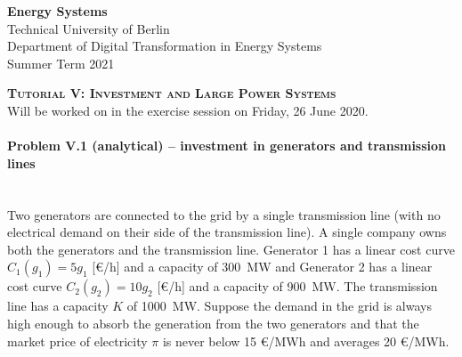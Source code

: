 \documentclass[11pt,a4paper,fleqn]{scrartcl}
\begin{document}
\begin{flushright}
	\textbf{Energy Systems}\\
	{\small Technical University of Berlin}\\
	{\small Department of Digital Transformation in Energy Systems}\\
	{\small Summer Term 2021}\\
\end{flushright}

 
 \vspace{-0.5em}
 \hrulefill
 \vspace{0.3em}

\begin{center}
 \textbf{\textsc{\Large Tutorial V: Investment and Large Power Systems}}\\
 \small Will be worked on in the exercise session on Friday, 26 June 2020.\\[1.5em]
\end{center}

\vspace{-0.5em}
\hrulefill
\vspace{0.8em}

\vspace{1em}

\paragraph{Problem V.1 (analytical) -- investment in generators and transmission lines \faGroup}~\\

Two generators are connected to the grid by a single transmission
line (with no electrical demand on their side of the transmission line). A single company owns both the generators and the transmission line. Generator 1 has a linear cost curve $C_1(g_1) = 5 g_1$ [\euro/h] and a capacity of 300~MW and Generator 2 has a linear cost curve $C_2(g_2) = 10 g_2$ [\euro/h] and a capacity of 900~MW. The transmission line has a capacity $K$ of 1000~MW. Suppose the demand in the grid is always high enough to absorb the
generation from the two generators and that the market price of
electricity $\pi$ is never below 15 \euro/MWh and averages 20
\euro/MWh.
\end{document}
